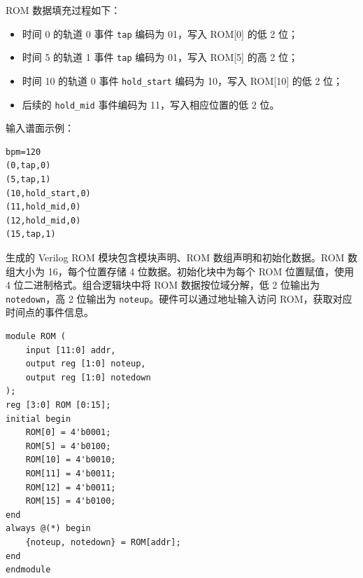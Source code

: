 \documentclass[12pt, a4paper]{article}
\begin{document}
ROM 数据填充过程如下：
\begin{itemize}
    \item 时间 0 的轨道 0 事件 \texttt{tap} 编码为 01，写入 ROM[0] 的低 2 位；
    \item 时间 5 的轨道 1 事件 \texttt{tap} 编码为 01，写入 ROM[5] 的高 2 位；
    \item 时间 10 的轨道 0 事件 \texttt{hold\_start} 编码为 10，写入 ROM[10] 的低 2 位；
    \item 后续的 \texttt{hold\_mid} 事件编码为 11，写入相应位置的低 2 位。
\end{itemize}

输入谱面示例：
\begin{verbatim}
bpm=120
(0,tap,0)
(5,tap,1)
(10,hold_start,0)
(11,hold_mid,0)
(12,hold_mid,0)
(15,tap,1)
\end{verbatim}

生成的 Verilog ROM 模块包含模块声明、ROM 数组声明和初始化数据。ROM 数组大小为 16，每个位置存储 4 位数据。初始化块中为每个 ROM 位置赋值，使用 4 位二进制格式。组合逻辑块中将 ROM 数据按位域分解，低 2 位输出为 \texttt{notedown}，高 2 位输出为 \texttt{noteup}。硬件可以通过地址输入访问 ROM，获取对应时间点的事件信息。

\begin{verbatim}
module ROM (
    input [11:0] addr,
    output reg [1:0] noteup,
    output reg [1:0] notedown
);
reg [3:0] ROM [0:15];
initial begin
    ROM[0] = 4'b0001;
    ROM[5] = 4'b0100;
    ROM[10] = 4'b0010;
    ROM[11] = 4'b0011;
    ROM[12] = 4'b0011;
    ROM[15] = 4'b0100;
end
always @(*) begin
    {noteup, notedown} = ROM[addr];
end
endmodule
\end{verbatim}
\end{document}
